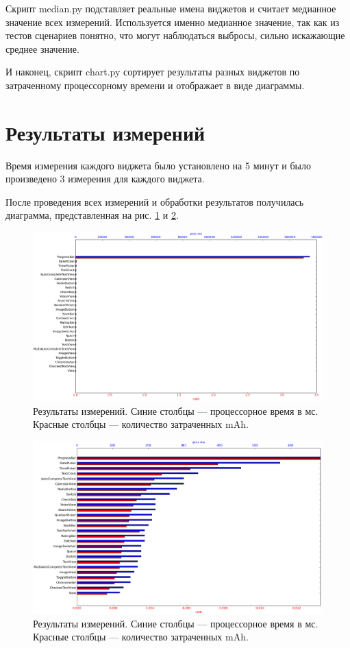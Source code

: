 \documentclass[a4paper,14pt]{extarticle} %
\begin{document}
	Скрипт median.py подставляет реальные имена виджетов и считает медианное значение всех измерений. Используется именно медианное значение, так как из тестов сценариев понятно, что могут наблюдаться выбросы, сильно искажающие среднее значение. 
	
	И наконец, скрипт chart.py сортирует результаты разных виджетов по затраченному процессорному времени и отображает в виде диаграммы.
	
	\clearpage
	\section{Результаты измерений}
	
	Время измерения каждого виджета было установлено на 5 минут и было произведено 3 измерения для каждого виджета.
	
	После проведения всех измерений и обработки результатов получилась диаграмма, представленная на рис. \ref{fig:result} и \ref{fig:result_scaled}.
	
	\begin{figure}[!htb]
		\includegraphics[width=\textwidth]{result}
		\caption{Результаты измерений. Синие столбцы --- процессорное время в мс. Красные столбцы --- количество затраченных mAh.}
		\label{fig:result}
	\end{figure}

	\begin{figure}[!htb]
		\includegraphics[width=\textwidth]{result_scaled}
		\caption{Результаты измерений. Синие столбцы --- процессорное время в мс. Красные столбцы --- количество затраченных mAh.}
		\label{fig:result_scaled}
	\end{figure}
\end{document}
